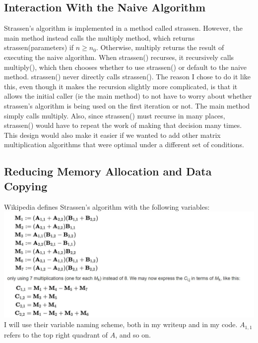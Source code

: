 \documentclass{article}
\begin{document}
\subsection*{Interaction With the Naive Algorithm}
Strassen's algorithm is implemented in a method called strassen. However, the main method instead calls the multiply method, which returns strassen(parameters) if $n \geq n_0$. Otherwise, multiply returns the result of executing the naive algorithm. When strassen() recurses, it recursively calls multiply(), which then chooses whether to use strassen() or default to the naive method. strassen() never directly calls strassen(). The reason I chose to do it like this, even though it makes the recursion slightly more complicated, is that it allows the initial caller (ie the main method) to not have to worry about whether strassen's algorithm is being used on the first iteration or not. The main method simply calls multiply. Also, since strassen() must recurse in many places, strassen() would have to repeat the work of making that decision many times. This design would also make it easier if we wanted to add other matrix multiplication algorithms that were optimal under a different set of conditions.  
\subsection*{Reducing Memory Allocation and Data Copying}
Wikipedia defines Strassen's algorithm with the following variables:\\
\includegraphics [scale = 0.4] {strassen} \\
I will use their variable naming scheme, both in my writeup and in my code. $A_{1,1}$ refers to the top right quadrant of $A$, and so on. 
\end{document}
